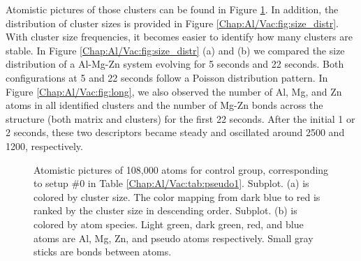 Atomistic pictures of those clusters can be found in Figure \ref{Chap:Al/Vac:fig:sens_control}. In addition, the distribution of cluster sizes is provided in Figure \ref{Chap:Al/Vac:fig:size_distr}. With cluster size frequencies, it becomes easier to identify how many clusters are stable. In Figure \ref{Chap:Al/Vac:fig:size_distr} (a) and (b) we compared the size distribution of a Al-Mg-Zn system evolving for 5 seconds and 22 seconds. Both configurations at 5 and 22 seconds follow a Poisson distribution pattern. In Figure \ref{Chap:Al/Vac:fig:long}, we also observed the number of Al, Mg, and Zn atoms in all identified clusters and the number of Mg-Zn bonds across the structure (both matrix and clusters) for the first 22 seconds. After the initial 1 or 2 seconds, these two descriptors became steady and oscillated around 2500 and 1200, respectively.


\newpage
\begingroup
\begin{figure}[!ht]
  \centering
\caption[Atomistic pictures of 108,000 atoms for the control group of the sensitivity test.]{Atomistic pictures of 108,000 atoms for control group, corresponding to setup \#0 in Table \ref{Chap:Al/Vac:tab:pseudo1}. Subplot. (a) is colored by cluster size. The color mapping from dark blue to red is ranked by the cluster size in descending order. Subplot. (b) is colored by atom species. Light green, dark green, red, and blue atoms are Al, Mg, Zn, and pseudo atoms respectively. Small gray sticks are bonds between atoms.}
\label{Chap:Al/Vac:fig:sens_control}
\end{figure}
\endgroup

